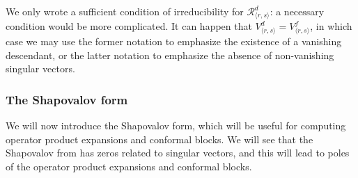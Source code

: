 \documentclass[12pt, a4paper]{article}
\begin{document}
We only wrote a sufficient condition of irreducibility for $\mathcal{R}^d_{\langle r,s\rangle}$: a necessary condition would be more complicated.
It can happen that $V^d_{\langle r,s\rangle}=V^f_{\langle r,s\rangle}$, in which case we may use the former notation to emphasize the existence of a vanishing descendant, or the latter notation to emphasize the absence of non-vanishing singular vectors.

\subsubsection{The Shapovalov form}

We will now introduce the Shapovalov form, which will be useful for computing operator product expansions and conformal blocks. We will see that the Shapovalov from has zeros related to singular vectors, and this will lead to poles of the operator product expansions and conformal blocks.
\end{document}
